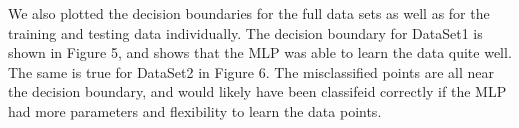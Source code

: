 \documentclass[letterpaper, 12pt]{article}
\begin{document}
We also plotted the decision boundaries for the full data sets as well as for the training and testing data individually. The decision boundary for DataSet1 is shown in Figure 5, and shows that the MLP was able to learn the data quite well. The same is true for DataSet2 in Figure 6. The misclassified points are all near the decision boundary, and would likely have been classifeid correctly if the MLP had more parameters and flexibility to learn the data points.
\end{document}
